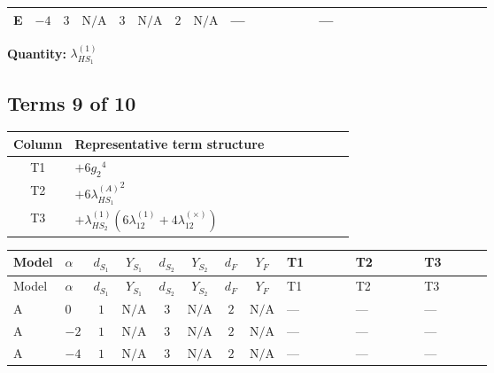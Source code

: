 \documentclass[8pt]{article}
\begin{document}
\begin{landscape}
\begin{longtable}{@{}llcccccc >{\raggedright\arraybackslash}p{0.21\linewidth} >{\raggedright\arraybackslash}p{0.21\linewidth} >{\raggedright\arraybackslash}p{0.21\linewidth}@{}}
\midrule
E & $-4$ & $3$ & $\text{N/A}$ & $3$ & $\text{N/A}$ & $2$ & $\text{N/A}$ & --- & --- & \scriptsize\adjustbox{max width=\linewidth}{$\begin{gathered} {\lambda_{HS_1}^{(1)}} (6 \operatorname{Tr}\!\left({Y_d}\,\left({Y_d}\right)^{\dagger}\right)+2 \operatorname{Tr}\!\left({Y_e}\,\left({Y_e}\right)^{\dagger}\right)+6 \operatorname{Tr}\!\left({Y_u}\,\left({Y_u}\right)^{\dagger}\right)+4 {\lambda_{S_1}^{(A)}})\end{gathered}$} \\
\midrule
\bottomrule
\end{longtable}
\clearpage
\noindent\textbf{Quantity: }$\lambda_{HS_1}^{(1)}$\par\smallskip
\subsection*{Terms 9 of 10}
\begin{center}
\begin{tabular}{@{}c >{\raggedright\arraybackslash}p{0.82\linewidth}@{}}
\toprule
Column & Representative term structure \\
\midrule
T1 & \(\displaystyle +6 {g_2}^4\) \\
\midrule
T2 & \(\displaystyle +6 {\lambda_{HS_1}^{(A)}}^2\) \\
\midrule
T3 & \(\displaystyle +{\lambda_{HS_2}^{(1)}} (6 {\lambda_{12}^{(1)}}+4 {\lambda_{12}^{(\times)}})\) \\
\midrule
\bottomrule
\end{tabular}
\end{center}
\smallskip
\tiny
\begin{longtable}{@{}llcccccc >{\raggedright\arraybackslash}p{0.21\linewidth} >{\raggedright\arraybackslash}p{0.21\linewidth} >{\raggedright\arraybackslash}p{0.21\linewidth}@{}}
\toprule
Model & $\alpha$ & $d_{S_1}$ & $Y_{S_1}$ & $d_{S_2}$ & $Y_{S_2}$ & $d_F$ & $Y_F$ & T1 & T2 & T3 \\
\midrule
\endfirsthead
\toprule
Model & $\alpha$ & $d_{S_1}$ & $Y_{S_1}$ & $d_{S_2}$ & $Y_{S_2}$ & $d_F$ & $Y_F$ & T1 & T2 & T3 \\
\midrule
\endhead
A & $0$ & $1$ & $\text{N/A}$ & $3$ & $\text{N/A}$ & $2$ & $\text{N/A}$ & --- & --- & --- \\
\midrule
A & $-2$ & $1$ & $\text{N/A}$ & $3$ & $\text{N/A}$ & $2$ & $\text{N/A}$ & --- & --- & --- \\
\midrule
A & $-4$ & $1$ & $\text{N/A}$ & $3$ & $\text{N/A}$ & $2$ & $\text{N/A}$ & --- & --- & --- \\

\end{longtable}
\end{landscape}
\end{document}
